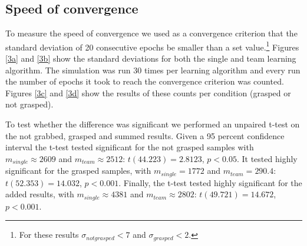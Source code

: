 \subsection{Speed of convergence}
To measure the speed of convergence we used as a convergence criterion that the standard deviation of 20 consecutive epochs be smaller than a set value.\footnote{For these results $\sigma_{not grasped} < 7$ and $\sigma_{grasped} < 2$.} Figures \ref{3a} and \ref{3b} show the standard deviations for both the single and team learning algorithm. The simulation was run 30 times per learning algorithm and every run the number of epochs it took to reach the convergence criterion was counted. Figures \ref{3c} and \ref{3d} show the results of these counts per condition (grasped or not grasped).

To test whether the difference was significant we performed an unpaired t-test on the not grabbed, grasped and summed results. Given a 95 percent confidence interval the t-test tested significant for the not grasped samples with $m_{single} \approx 2609$ and $m_{team} \approx 2512$: $t(44.223) = 2.8123$, $p < 0.05$. It tested highly significant for the grasped samples, with $m_{single} = 1772$ and $m_{team} = 290.4$: $t(52.353) = 14.032$, $p<0.001$. Finally, the t-test tested highly significant for the added results, with $m_{single} \approx 4381$ and $m_{team} \approx 2802$: $t(49.721) = 14.672$, $p < 0.001$. 
